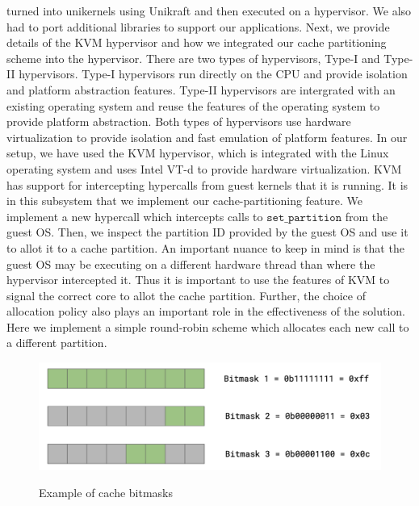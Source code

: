 \documentclass[sigconf,authorversion,noacm]{acmart}
\begin{document}
turned into unikernels using Unikraft and then executed on a hypervisor. We also
had to port additional libraries to support our applications. Next, we provide
details of the KVM hypervisor and how we integrated our cache partitioning
scheme into the hypervisor. There are two types of hypervisors, Type-I and
Type-II hypervisors. Type-I hypervisors run directly on the CPU and provide
isolation and platform abstraction features. Type-II hypervisors are intergrated
with an existing operating system and reuse the features of the operating
system to provide platform abstraction. Both types of hypervisors use hardware
virtualization to provide isolation and fast emulation of platform features. In
our setup, we have used the KVM hypervisor, which is integrated with the Linux
operating system and uses Intel VT-d to provide hardware virtualization. KVM has
support for intercepting hypercalls from guest kernels that it is running. It is
in this subsystem that we implement our cache-partitioning feature. We implement
a new hypercall which intercepts calls to $\texttt{set\_partition}$ from the
guest OS. Then, we inspect the partition ID provided by the guest OS and use it
to allot it to a cache partition. An important nuance to keep in mind is that
the guest OS may be executing on a different hardware thread than where the
hypervisor intercepted it. Thus it is important to use the features of KVM to
signal the correct core to allot the cache partition. Further, the choice of
allocation policy also plays an important role in the effectiveness of the
solution. Here we implement a simple round-robin scheme which allocates each new
call to a different partition.

\begin{figure}[h]
  \centering
  \includegraphics[width=\linewidth]{bitmasks}
    \label{fig:bitmasks}
    \vspace{-2em}
    \caption{Example of cache bitmasks}
\end{figure}
\end{document}
